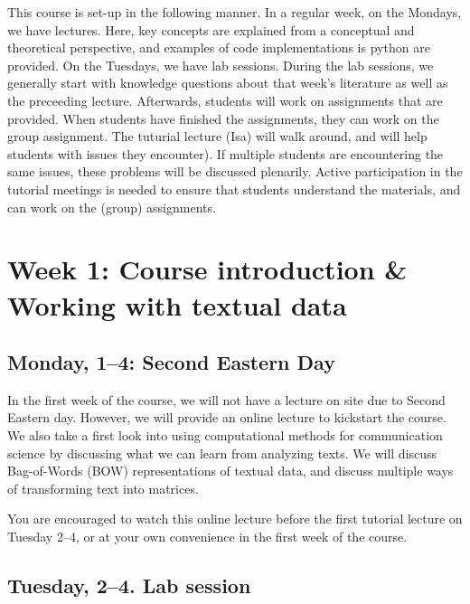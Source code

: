 This course is set-up in the following manner. In a regular week, on the Mondays, we have lectures. Here, key concepts are explained from a conceptual and theoretical perspective, and examples of code implementations is python are provided.  On the Tuesdays, we have lab sessions. During the lab sessions, we generally start with knowledge questions about that week's literature as well as the preceeding lecture. Afterwards, students will work on assignments that are provided. When students have finished the assignments, they can work on the group assignment. The tuturial lecture (Isa) will walk around, and will help students with issues they encounter). If multiple students are encountering the same issues, these problems will be discussed plenarily. Active participation in the tutorial meetings is needed to ensure that students understand the materials, and can work on the (group) assignments.

\section*{Week 1: Course introduction \& Working with textual data}

\subsection*{Monday, 1--4:  Second Eastern Day}

In the first week of the course, we will not have a lecture on site due to Second Eastern day. However, we will provide an online lecture to kickstart the course. We also take a first look into using computational methods for communication science by discussing what we can learn from analyzing texts. We will discuss Bag-of-Words (BOW) representations of textual data, and discuss multiple ways of transforming text into matrices. 

You are encouraged to watch this online lecture  before the first tutorial lecture on Tuesday 2--4, or at your own convenience in the first week of the course. 


\subsection*{Tuesday, 2--4. Lab session}

